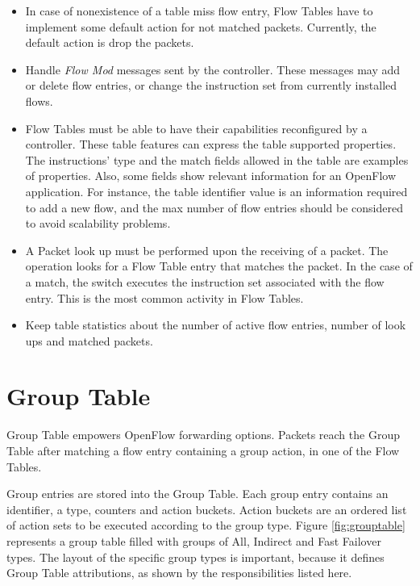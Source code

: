 	\begin{itemize}

    \item In case of nonexistence of a table miss flow entry, Flow Tables have to implement some default action for not matched packets. Currently, the default action is drop the packets. 

	\item Handle \textit{Flow Mod} messages sent by the controller. These messages may add or delete flow entries, or change the instruction set from currently installed flows.  

	\item Flow Tables must be able to have their capabilities reconfigured by a controller. These table features can express the table supported properties. The instructions' type and the match fields allowed in the table are examples of properties. Also, some fields show relevant information for an OpenFlow application. For instance, the table identifier value is an information required to add a new flow, and the max number of flow entries should be considered to avoid scalability problems.           

    \item A Packet look up must be performed upon the receiving of a packet. The operation looks for a Flow Table entry that matches the packet. In the case of a match, the switch executes the instruction set associated with the flow entry. This is the most common activity in Flow Tables.   
    
    \item Keep table statistics about the number of active flow entries, number of look ups and matched packets.  

	\end{itemize}

	\section{Group Table}

	Group Table empowers OpenFlow forwarding options. Packets reach the Group Table after matching a flow entry containing a group action, in one of the Flow Tables. 
	
	Group entries are stored into the Group Table. Each group entry contains an identifier, a type, counters and action buckets. Action buckets are an ordered list of action sets to be executed according to the group type. Figure \ref{fig:grouptable} represents a group table filled with groups of All, Indirect and Fast Failover types. The layout of the specific group types is important, because it defines Group Table attributions, as shown by the responsibilities listed here.
	
